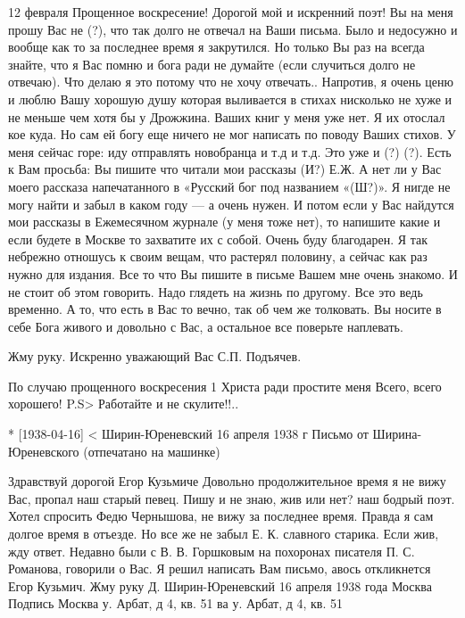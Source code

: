 12 февраля
Прощенное воскресение!
Дорогой мой и искренний поэт!
Вы на меня прошу Вас не (?),  что так долго не отвечал на Ваши письма. Было  и недосужно и вообще как то за последнее время я закрутился. Но только Вы раз на всегда знайте, что я Вас помню и бога ради не думайте (если случиться долго не отвечаю). Что делаю я это потому что не хочу отвечать.. Напротив, я очень ценю и люблю Вашу хорошую душу которая выливается в стихах нисколько не хуже и не меньше чем хотя бы у Дрожжина.
Ваших книг у меня уже нет. Я их отослал кое куда. Но сам ей богу еще ничего не мог написать по поводу Ваших стихов. У меня сейчас горе: иду отправлять новобранца и т.д и т.д. Это уже и (?) (?).
Есть к Вам просьба: Вы пишите что читали мои рассказы (И?) Е.Ж.  А нет ли у Вас моего рассказа напечатанного в «Русский бог под названием «(Ш?)». Я нигде не могу найти и забыл в каком году — а очень нужен. И потом если у Вас найдутся  мои рассказы в Ежемесячном журнале (у меня тоже нет), то напишите какие и если будете в Москве то захватите их с собой. Очень буду благодарен. Я так небрежно отношусь к своим вещам, что растерял половину, а сейчас как раз нужно для издания.
Все то что Вы пишите в письме Вашем мне очень знакомо. И не стоит об этом говорить. Надо глядеть на жизнь по другому. Все это ведь временно. А то, что есть в Вас то вечно, так об чем же толковать. Вы носите в себе Бога живого и довольно с Вас, а остальное все поверьте наплевать.

Жму руку.
Искренно уважающий Вас С.П. Подъячев.

По случаю прощенного воскресения 
1 Христа ради простите меня
Всего, всего хорошего!
P.S> Работайте и не скулите!!..

* [1938-04-16] < Ширин-Юреневский
16 апреля 1938 г 
Письмо  от Ширина-Юреневского (отпечатано на машинке)

Здравствуй дорогой Егор Кузьмиче
Довольно продолжительное время я не вижу Вас, пропал наш старый певец. Пишу и не знаю, жив или нет? наш бодрый поэт. Хотел спросить Федю Чернышова, не вижу за последнее время.  Правда я сам долгое время в отъезде. Но все же не забыл Е. К. славного старика.
Если жив, жду ответ. Недавно были с В. В. Горшковым на похоронах писателя П. С. Романова, говорили о Вас.
Я решил написать Вам письмо, авось откликнется Егор Кузьмич.
Жму руку Д. Ширин-Юреневский
16 апреля 1938 года
Москва
Подпись
Москва у. Арбат, д 4, кв. 51
ва у. Арбат, д 4, кв. 51
